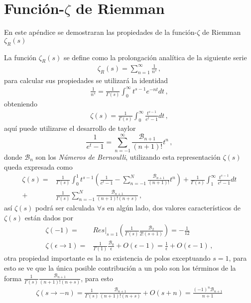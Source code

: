 \chapter{Función-\texorpdfstring{$\zeta$}{}  de Riemman} \label{Apendice.3}

En este apéndice se demostraran las propiedades de la función-$\zeta$ de Riemman $\zeta _R (s)$

La función $\zeta _R (s)$ se define como la prolongación analítica de la siguiente serie
\begin{align}
	\zeta _R (s) = 
	\sum _{n=1} ^{\infty} \frac{1}{n ^{s}}
	\, ,
\end{align}
para calcular sus propiedades se utilizará la identidad
\begin{align}
	\frac{1}{n ^{s}} =
	\frac{1}{\Gamma (s)} 
	\int _0 ^{\infty} t^{s-1} e ^{-n t}  dt
	\, ,
\end{align}
obteniendo
\begin{align}
	\zeta (s) = 
	\frac{1}{\Gamma (s)}
	\int _0 ^\infty
	\frac{t ^{s-1}}{e ^t -1} dt
	\, ,
\end{align}
aquí puede utilizarse el desarrollo de taylor 
\begin{equation}
	\frac{1}{e ^t -1} = 
	\sum _{n=-1} ^{\infty}
	\frac{ \mathcal{B} _{n+1}}{(n+1)!} t ^n
	\, ,
\end{equation}
donde $\mathcal{B} _{n}$ son los {\it Números de Bernoulli}, utilizando esta representación $\zeta (s)$ queda expresada como
\begin{align}
	\zeta (s) = 
&
	\frac{1}{\Gamma (s)}
	\int _0 ^1 
	t ^{s-1} 
	\left(	
		\frac{1}{e ^t -1} -
		\sum _{n=-1} ^{N}
		\frac{ \mathcal{B} _{n+1}}{(n+1)!} t ^n	
		\right)		
		+
	\frac{1}{\Gamma (s)}
	\int _1 ^\infty
	\frac{t ^{s-1}}{e ^t -1} dt
\\
	+
&
	\frac{1}{\Gamma (s)}
	\sum _{n=-1} ^{N}
	\frac{ \mathcal{B} _{n+1}}{ (n+1)! (n + s)}
	\, ,
\end{align}
así $\zeta (s)$ podrá ser calculada $\forall s $ en algún lado, dos valores característicos de $\zeta(s)$ están dados por
\begin{align}
	\zeta (-1) = 
&
	Res \Big| _{s=1}
		\left(
			\frac{1}{\Gamma (s)} \frac{\mathcal{B} _2}{2! (s+1)}
			\right) =
	- \frac{1}{12}
\\
	\zeta (\epsilon \rightarrow 1) =
& 
	\frac{1}{\Gamma (1)} \frac{\mathcal{B} _0}{ \epsilon} + O (\epsilon -1 ) = 
	\frac{1}{ \epsilon} + O (\epsilon -1 ) 
	\, ,
\end{align}
otra propiedad importante es la no existencia de polos exceptuando $s=1$, para esto se ve que la única posible contribución a un polo son los términos de la forma  $	\frac{1}{\Gamma (s)} \frac{ \mathcal{B} _{n+1}}{ (n+1)! (n + s)}$, para esto 
\begin{align}
	\zeta ( s \rightarrow -n ) = 
	\frac{1}{\Gamma (s)}
	\frac{ \mathcal{B} _{n+1}}{ (n+1)! (n + s)}
	+ O (s + n) = 
	\frac{(-1) ^n \mathcal{B} _{n+1}}
		{n+1}
\end{align}






















